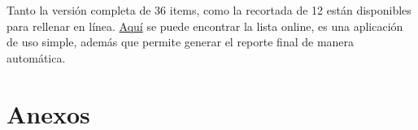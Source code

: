 \documentclass[
  spanish,
  letterpaper,
  DIV=11,
  numbers=noendperiod]{scrreprt}
\begin{document}
Tanto la versión completa de 36 items, como la recortada de 12 están
disponibles para rellenar en línea.
\href{http://www.shinyapps.org/apps/TransparencyChecklist/}{Aquí} se
puede encontrar la lista online, es una aplicación de uso simple, además
que permite generar el reporte final de manera automática.

\section*{Anexos}\label{anexos}


\begin{table}

\caption{\label{tbl-tabqrp}Algunas situaciones de QRP}

\centering{

\begingroup\fontsize{10}{12}\selectfont

}
\end{table}
\end{document}

